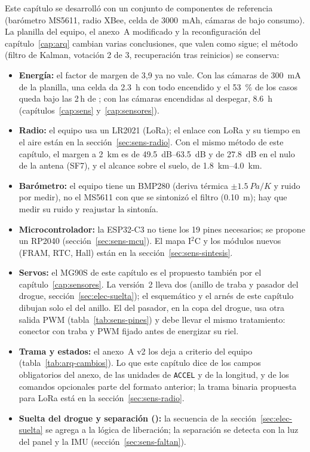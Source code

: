\begin{nota}
Este capítulo se desarrolló con un conjunto de componentes de referencia (barómetro MS5611, radio
XBee, celda de \SI{3000}{mAh}, cámaras de bajo consumo). La planilla del equipo, el anexo~A modificado y la
reconfiguración del capítulo~\ref{cap:arq} cambian varias conclusiones, que valen como sigue; el método
(filtro de Kalman, votación 2 de 3, recuperación tras reinicios) se conserva:
\begin{itemize}[leftmargin=*,nosep]
  \item \textbf{Energía:} el factor de margen de 3,9 ya no vale. Con las cámaras de \SI{300}{mA} de la planilla, una
        celda da \SI{2.3}{h} con todo encendido y el \SI{53}{\percent} de los casos queda bajo las 2\,h de
        ; con las cámaras encendidas al despegar, \SI{8.6}{h} (capítulos~\ref{cap:sens} y~\ref{cap:sensores}).
  \item \textbf{Radio:} el equipo usa un LR2021 (LoRa); el enlace con LoRa y su tiempo en el aire están en la
        sección~\ref{sec:sens-radio}. Con el mismo método de este capítulo, el margen a \SI{2}{km} es de
        \SIrange{49.5}{63.5}{dB} y de \SI{27.8}{dB} en el nulo de la antena (SF7), y el alcance sobre el suelo, de
        \SIrange{1.8}{4.0}{km}.
  \item \textbf{Barómetro:} el equipo tiene un BMP280 (deriva térmica $\pm\SI{1.5}{Pa/K}$ y ruido por medir), no el
        MS5611 con que se sintonizó el filtro (\SI{0.10}{m}); hay que medir su ruido y reajustar la sintonía.
  \item \textbf{Microcontrolador:} la ESP32-C3 no tiene los 19 pines necesarios; se propone un RP2040
        (sección~\ref{sec:sens-mcu}). El mapa I$^2$C y los módulos nuevos (FRAM, RTC, Hall) están en la
        sección~\ref{sec:sens-sintesis}.
  \item \textbf{Servos:} el MG90S de este capítulo es el propuesto también por el capítulo~\ref{cap:sensores}. La
        versión~2 lleva dos (anillo de traba y pasador del drogue, sección~\ref{sec:elec-suelta}); el esquemático y el
        arnés de este capítulo dibujan solo el del anillo. El del pasador, en la copa del drogue, usa otra salida PWM
        (tabla~\ref{tab:sens-pines}) y debe llevar el mismo tratamiento: conector con traba y PWM fijado antes de
        energizar su riel.
  \item \textbf{Trama y estados:} el anexo~A v2 los deja a criterio del equipo (tabla~\ref{tab:arq-cambios}). Lo que
        este capítulo dice de los campos obligatorios del anexo, de las unidades de \texttt{ACCEL} y de la longitud, y
        de los comandos opcionales parte del formato anterior; la trama binaria propuesta para LoRa está en la
        sección~\ref{sec:sens-radio}.
  \item \textbf{Suelta del drogue y separación ():} la secuencia de la sección~\ref{sec:elec-suelta} se
        agrega a la lógica de liberación; la separación se detecta con la luz del panel y la IMU (sección~\ref{sec:sens-faltan}).
\end{itemize}
\end{nota}

